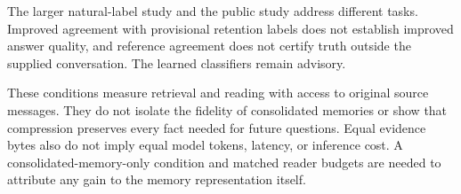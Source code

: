 The larger natural-label study and the public study address different tasks.
Improved agreement with provisional retention labels does not establish improved
answer quality, and reference agreement does not certify truth outside the
supplied conversation. The learned classifiers remain advisory.

These conditions measure retrieval and reading with access to original source
messages. They do not isolate the fidelity of consolidated memories or show
that compression preserves every fact needed for future questions. Equal
evidence bytes also do not imply equal model tokens, latency, or inference
cost. A consolidated-memory-only condition and matched reader budgets are
needed to attribute any gain to the memory representation itself.
